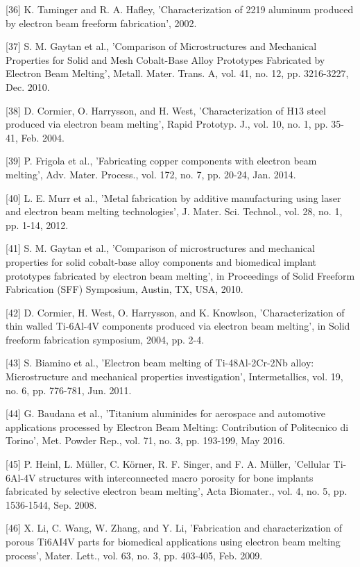 \documentclass[10pt]{article}
\begin{document}
[36] K. Taminger and R. A. Hafley, 'Characterization of 2219 aluminum produced by electron beam freeform fabrication', 2002.

[37] S. M. Gaytan et al., 'Comparison of Microstructures and Mechanical Properties for Solid and Mesh Cobalt-Base Alloy Prototypes Fabricated by Electron Beam Melting', Metall. Mater. Trans. A, vol. 41, no. 12, pp. 3216-3227, Dec. 2010.

[38] D. Cormier, O. Harrysson, and H. West, 'Characterization of $\mathrm{H} 13$ steel produced via electron beam melting', Rapid Prototyp. J., vol. 10, no. 1, pp. 35-41, Feb. 2004.

[39] P. Frigola et al., 'Fabricating copper components with electron beam melting', Adv. Mater. Process., vol. 172, no. 7, pp. 20-24, Jan. 2014.

[40] L. E. Murr et al., 'Metal fabrication by additive manufacturing using laser and electron beam melting technologies', J. Mater. Sci. Technol., vol. 28, no. 1, pp. 1-14, 2012.

[41] S. M. Gaytan et al., 'Comparison of microstructures and mechanical properties for solid cobalt-base alloy components and biomedical implant prototypes fabricated by electron beam melting', in Proceedings of Solid Freeform Fabrication (SFF) Symposium, Austin, TX, USA, 2010.

[42] D. Cormier, H. West, O. Harrysson, and K. Knowlson, 'Characterization of thin walled Ti-6Al-4V components produced via electron beam melting', in Solid freeform fabrication symposium, 2004, pp. 2-4.

[43] S. Biamino et al., 'Electron beam melting of Ti-48Al-2Cr-2Nb alloy: Microstructure and mechanical properties investigation', Intermetallics, vol. 19, no. 6, pp. 776-781, Jun. 2011.

[44] G. Baudana et al., 'Titanium aluminides for aerospace and automotive applications processed by Electron Beam Melting: Contribution of Politecnico di Torino', Met. Powder Rep., vol. 71, no. 3, pp. 193-199, May 2016.

[45] P. Heinl, L. Müller, C. Körner, R. F. Singer, and F. A. Müller, 'Cellular Ti-6Al-4V structures with interconnected macro porosity for bone implants fabricated by selective electron beam melting', Acta Biomater., vol. 4, no. 5, pp. 1536-1544, Sep. 2008.

[46] X. Li, C. Wang, W. Zhang, and Y. Li, 'Fabrication and characterization of porous Ti6AI4V parts for biomedical applications using electron beam melting process', Mater. Lett., vol. 63, no. 3, pp. 403-405, Feb. 2009.
\end{document}
